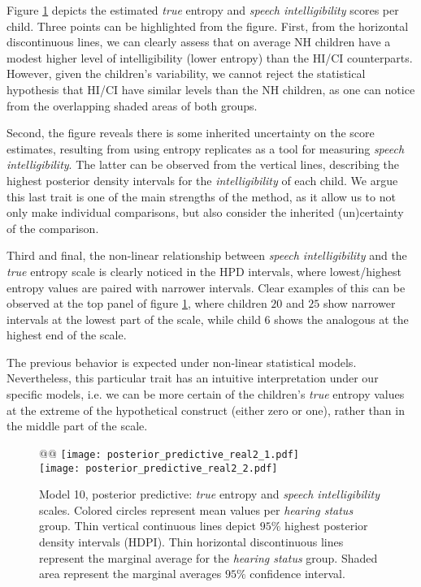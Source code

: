 Figure \ref{fig:predictive2} depicts the estimated \textit{true} entropy and \textit{speech intelligibility} scores per child. Three points can be highlighted from the figure. First, from the horizontal discontinuous lines, we can clearly assess that on average NH children have a modest higher level of intelligibility (lower entropy) than the HI/CI counterparts. However, given the children's variability, we cannot reject the statistical hypothesis that HI/CI have similar levels than the NH children, as one can notice from the overlapping shaded areas of both groups. 

Second, the figure reveals there is some inherited uncertainty on the score estimates, resulting from using entropy replicates as a tool for measuring \textit{speech intelligibility}. The latter can be observed from the vertical lines, describing the highest posterior density intervals for the \textit{intelligibility} of each child. We argue this last trait is one of the main strengths of the method, as it allow us to not only make individual comparisons, but also consider the inherited (un)certainty of the comparison.

Third and final, the non-linear relationship between \textit{speech intelligibility} and the \textit{true} entropy scale is clearly noticed in the HPD intervals, where lowest/highest entropy values are paired with narrower intervals. Clear examples of this can be observed at the top panel of figure \ref{fig:predictive2}, where children $20$ and $25$ show narrower intervals at the lowest part of the scale, while child $6$ shows the analogous at the highest end of the scale. 

The previous behavior is expected under non-linear statistical models. Nevertheless, this particular trait has an intuitive interpretation under our specific models, i.e. we can be more certain of the children's \textit{true} entropy values at the extreme of the hypothetical construct (either zero or one), rather than in the middle part of the scale.
%
%
\begin{figure}[!h]
	\centering
	\begin{tabular}{@{}@{}}
		\texttt{[image: posterior\_predictive\_real2\_1.pdf]} \\
		\texttt{[image: posterior\_predictive\_real2\_2.pdf]}
	\end{tabular}
	\caption[Model 10, posterior predictive: \textit{true} entropy and \textit{speech intelligibility} scales]{Model 10, posterior predictive: \textit{true} entropy and \textit{speech intelligibility} scales. Colored circles represent mean values per \textit{hearing status} group. Thin vertical continuous lines depict $95\%$ highest posterior density intervals (HDPI). Thin horizontal discontinuous lines represent the marginal average for the \textit{hearing status} group. Shaded area represent the marginal averages $95\%$ confidence interval.}
	\label{fig:predictive2}
\end{figure}
%
%
